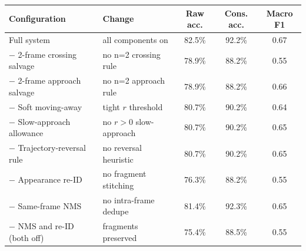 \begin{tabular}{llccc}
\toprule
Configuration & Change & Raw acc. & Cons. acc. & Macro F1 \\
\midrule
Full system & all components on & 82.5\% & 92.2\% & 0.67 \\
$-$ 2-frame crossing salvage & no n=2 crossing rule & 78.9\% & 88.2\% & 0.55 \\
$-$ 2-frame approach salvage & no n=2 approach rule & 78.9\% & 88.2\% & 0.66 \\
$-$ Soft moving-away & tight $r$ threshold & 80.7\% & 90.2\% & 0.64 \\
$-$ Slow-approach allowance & no $r{>}0$ slow-approach & 80.7\% & 90.2\% & 0.65 \\
$-$ Trajectory-reversal rule & no reversal heuristic & 80.7\% & 90.2\% & 0.65 \\
$-$ Appearance re-ID & no fragment stitching & 76.3\% & 88.2\% & 0.55 \\
$-$ Same-frame NMS & no intra-frame dedupe & 81.4\% & 92.3\% & 0.65 \\
$-$ NMS and re-ID (both off) & fragments preserved & 75.4\% & 88.5\% & 0.55 \\
\bottomrule
\end{tabular}
